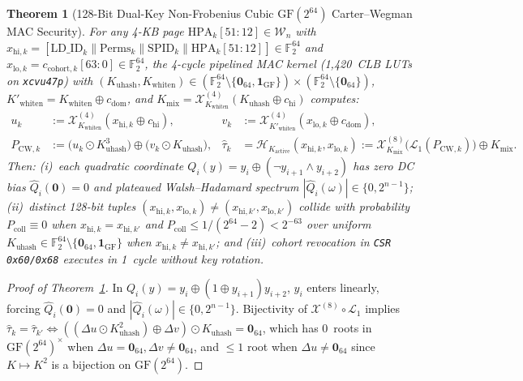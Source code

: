 \documentclass[10pt,twocolumn]{article}
\providecommand{\SharedCubicMacLUTs}{1,420}
\theoremstyle{spectralthm}
\newtheorem{theorem}{Theorem}[section]
\begin{document}
\begin{theorem}[128-Bit Dual-Key Non-Frobenius Cubic $\mathrm{GF}(2^{64})$ Carter--Wegman MAC Security]
\label{thm:mac}
For any 4-KB page $\mathrm{HPA}_k[51:12] \in \mathcal{W}_n$ with $x_{\mathrm{hi},k} = [\mathrm{LD\_ID}_k \parallel \mathrm{Perms}_k \parallel \mathrm{SPID}_k \parallel \mathrm{HPA}_k[51:12]] \in \mathbb{F}_2^{64}$ and $x_{\mathrm{lo},k} = c_{\mathrm{cohort},k}[63:0] \in \mathbb{F}_2^{64}$, the 4-cycle pipelined MAC kernel (\SharedCubicMacLUTs~CLB LUTs on \texttt{xcvu47p}) with $(K_{\mathrm{uhash}}, K_{\mathrm{whiten}}) \in (\mathbb{F}_2^{64} \setminus \{\mathbf{0}_{64}, \mathbf{1}_{\mathrm{GF}}\}) \times (\mathbb{F}_2^{64} \setminus \{\mathbf{0}_{64}\})$, $K'_{\mathrm{whiten}} = K_{\mathrm{whiten}} \oplus c_{\mathrm{dom}}$, and $K_{\mathrm{mix}} = \mathcal{X}_{K_{\mathrm{whiten}}}^{(4)}(K_{\mathrm{uhash}} \oplus c_{\mathrm{hi}})$ computes:
\begin{equation}
\label{eq:mac}
\begin{aligned}
u_k &:= \mathcal{X}_{K_{\mathrm{whiten}}}^{(4)}(x_{\mathrm{hi},k} \oplus c_{\mathrm{hi}}), &
v_k &:= \mathcal{X}_{K'_{\mathrm{whiten}}}^{(4)}(x_{\mathrm{lo},k} \oplus c_{\mathrm{dom}}),\\
P_{\mathrm{CW},k} &:= \bigl(u_k \odot K_{\mathrm{uhash}}^3\bigr) \oplus \bigl(v_k \odot K_{\mathrm{uhash}}\bigr), &
\hat{\tau}_k &= \mathcal{H}_{K_{\mathrm{active}}}(x_{\mathrm{hi},k}, x_{\mathrm{lo},k}) := \mathcal{X}_{K_{\mathrm{mix}}}^{(8)}\bigl(\mathcal{L}_1(P_{\mathrm{CW},k})\bigr) \oplus K_{\mathrm{mix}}.
\end{aligned}
\end{equation}
Then: (i)~each quadratic coordinate $Q_i(y) = y_i \oplus (\neg y_{i+1} \wedge y_{i+2})$ has zero DC bias $\hat{Q}_i(\mathbf{0}) = 0$ and plateaued Walsh--Hadamard spectrum $|\hat{Q}_i(\omega)| \in \{0, 2^{n-1}\}$; (ii)~distinct 128-bit tuples $(x_{\mathrm{hi},k}, x_{\mathrm{lo},k}) \neq (x_{\mathrm{hi},k'}, x_{\mathrm{lo},k'})$ collide with probability $P_{\mathrm{coll}} \equiv 0$ when $x_{\mathrm{hi},k} = x_{\mathrm{hi},k'}$ and $P_{\mathrm{coll}} \le 1/(2^{64}-2) < 2^{-63}$ over uniform $K_{\mathrm{uhash}} \in \mathbb{F}_2^{64} \setminus \{\mathbf{0}_{64}, \mathbf{1}_{\mathrm{GF}}\}$ when $x_{\mathrm{hi},k} \neq x_{\mathrm{hi},k'}$; and (iii)~cohort revocation in \texttt{CSR 0x60/0x68} executes in 1~cycle without key rotation.
\end{theorem}
\begin{proof}[Proof of Theorem~\ref{thm:mac}]
In $Q_i(y) = y_i \oplus (1 \oplus y_{i+1})y_{i+2}$, $y_i$ enters linearly, forcing $\hat{Q}_i(\mathbf{0}) = 0$ and $|\hat{Q}_i(\omega)| \in \{0, 2^{n-1}\}$. Bijectivity of $\mathcal{X}^{(8)} \circ \mathcal{L}_1$ implies $\hat{\tau}_k = \hat{\tau}_{k'} \iff ((\Delta u \odot K_{\mathrm{uhash}}^2) \oplus \Delta v) \odot K_{\mathrm{uhash}} = \mathbf{0}_{64}$, which has 0~roots in $\mathrm{GF}(2^{64})^\times$ when $\Delta u = \mathbf{0}_{64}, \Delta v \neq \mathbf{0}_{64}$, and $\le 1$ root when $\Delta u \neq \mathbf{0}_{64}$ since $K \mapsto K^2$ is a bijection on $\mathrm{GF}(2^{64})$.
\end{proof}
\end{document}
